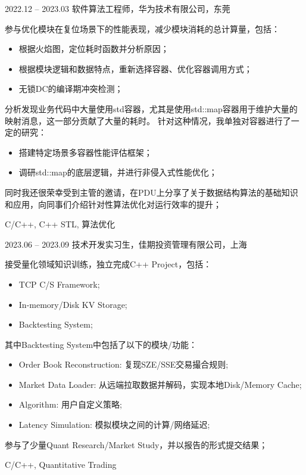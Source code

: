%
%

 
\begin{experiences}
  \experiencenew
  {2022.12 -- 2023.03} {软件算法工程师，华为技术有限公司，东莞}
  {
    参与优化模块在复位场景下的性能表现，减少模块消耗的总计算量，包括：
    \begin{itemize}
  		\item 根据火焰图，定位耗时函数并分析原因；
  		\item 根据模块逻辑和数据特点，重新选择容器、优化容器调用方式；
  		\item 无锁DC的编译期冲突检测；
  	\end{itemize}
    分析发现业务代码中大量使用std容器，尤其是使用std::map容器用于维护大量的映射消息，这一部分贡献了大量的耗时。
    针对这种情况，我单独对容器进行了一定的研究：
    \begin{itemize}
  		\item 搭建特定场景多容器性能评估框架；
  		\item 调研std::map的底层逻辑，并进行非侵入式性能优化；
  	\end{itemize}
    同时我还很荣幸受到主管的邀请，在PDU上分享了关于数据结构算法的基础知识和应用，向同事们介绍针对性算法优化对运行效率的提升；
                }
                {C/C++, C++ STL, 算法优化}
\emptySeparator	

  \experiencenew
  {2023.06 -- 2023.09} {技术开发实习生，佳期投资管理有限公司，上海}
  {
    接受量化领域知识训练，独立完成C++ Project，包括：
    \begin{itemize}
  		\item TCP C/S Framework;
  		\item In-memory/Disk KV Storage;
  		\item Backtesting System;
  	\end{itemize}
    其中Backtesting System中包括了以下的模块/功能：
    \begin{itemize}
  		\item Order Book Reconstruction: 复现SZE/SSE交易撮合规则;
  		\item Market Data Loader: 从远端拉取数据并解码，实现本地Disk/Memory Cache;
  		\item Algorithm: 用户自定义策略;
  		\item Latency Simulation: 模拟模块之间的计算/网络延迟;
  	\end{itemize}
    参与了少量Quant Research/Market Study，并以报告的形式提交结果；
                }
                {C/C++, Quantitative Trading}



\end{experiences}
